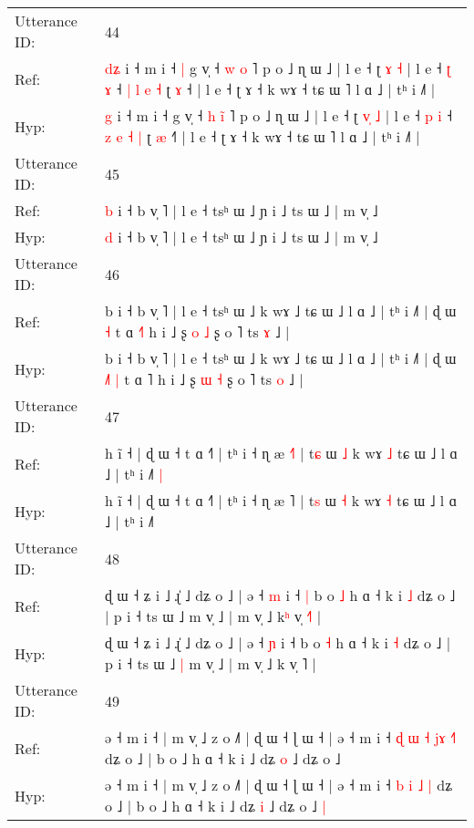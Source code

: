 \documentclass[10pt]{article}
\DeclareRobustCommand{\hl}[1]{{\textcolor{red}{#1}}}
\begin{document}
\begin{longtable}{ll}
\midrule
Utterance ID: & 44 \\
Ref: & \hl{d}\hl{ʑ} i ˧ m i ˧\hl{ }\hl{|} g v̩ ˧ \hl{w} \hl{}\hl{o} ˥ p o ˩ ɳ ɯ ˩ | l e ˧ ʈ \hl{}\hl{ɤ} \hl{˧} | l e ˧ \hl{ʈ} \hl{ɤ} ˧ \hl{|} \hl{l} \hl{e} \hl{˧} ʈ \hl{ɤ} ˧\hl{} | l e ˧ ʈ ɤ ˧ k wɤ ˧ tɕ ɯ ˥ l ɑ ˩ | tʰ i ˩˥ |
 \\
Hyp: & \hl{}\hl{g} i ˧ m i ˧\hl{}\hl{} g v̩ ˧ \hl{h} \hl{i}\hl{̃} ˥ p o ˩ ɳ ɯ ˩ | l e ˧ ʈ \hl{v}\hl{̩} \hl{˩} | l e ˧ \hl{p} \hl{i} ˧ \hl{z} \hl{e} \hl{˧} \hl{|} ʈ \hl{æ} ˧\hl{˥} | l e ˧ ʈ ɤ ˧ k wɤ ˧ tɕ ɯ ˥ l ɑ ˩ | tʰ i ˩˥ |
 \\
\midrule
Utterance ID: & 45 \\
Ref: & \hl{b} i ˧ b v̩ ˥ | l e ˧ tsʰ ɯ ˩ ɲ i ˩ ts ɯ ˩ | m v̩ ˩
 \\
Hyp: & \hl{d} i ˧ b v̩ ˥ | l e ˧ tsʰ ɯ ˩ ɲ i ˩ ts ɯ ˩ | m v̩ ˩
 \\
\midrule
Utterance ID: & 46 \\
Ref: & b i ˧ b v̩ ˥ | l e ˧ tsʰ ɯ ˩ k wɤ ˩ tɕ ɯ ˩ l ɑ ˩ | tʰ i ˩˥ | ɖ ɯ\hl{}\hl{}\hl{} \hl{˧} t ɑ \hl{˧}˥ h i ˩ ʂ \hl{o} \hl{˩} ʂ o ˥ ts \hl{ɤ} ˩ |
 \\
Hyp: & b i ˧ b v̩ ˥ | l e ˧ tsʰ ɯ ˩ k wɤ ˩ tɕ ɯ ˩ l ɑ ˩ | tʰ i ˩˥ | ɖ ɯ\hl{ }\hl{˩}\hl{˥} \hl{|} t ɑ \hl{}˥ h i ˩ ʂ \hl{ɯ} \hl{˧} ʂ o ˥ ts \hl{o} ˩ |
 \\
\midrule
Utterance ID: & 47 \\
Ref: & h ĩ ˧ | ɖ ɯ ˧ t ɑ ˧˥ | tʰ i ˧ ɳ æ \hl{˧}˥ | t\hl{ɕ} ɯ \hl{˩} k wɤ \hl{˩} tɕ ɯ ˩ l ɑ ˩ | tʰ i ˩˥\hl{ }\hl{|}
 \\
Hyp: & h ĩ ˧ | ɖ ɯ ˧ t ɑ ˧˥ | tʰ i ˧ ɳ æ \hl{}˥ | t\hl{s} ɯ \hl{˧} k wɤ \hl{˧} tɕ ɯ ˩ l ɑ ˩ | tʰ i ˩˥\hl{}\hl{}
 \\
\midrule
Utterance ID: & 48 \\
Ref: & ɖ ɯ ˧ ʑ i ˩ ɻ̍ ˩ dʑ o ˩ | ə ˧ \hl{m} i ˧\hl{ }\hl{|} b o \hl{˩} h ɑ ˧ k i \hl{˩} dʑ o ˩ | p i ˧ ts ɯ ˩\hl{}\hl{} m v̩ ˩ | m v̩ ˩ k\hl{ʰ} v̩ \hl{˧}˥ |
 \\
Hyp: & ɖ ɯ ˧ ʑ i ˩ ɻ̍ ˩ dʑ o ˩ | ə ˧ \hl{ɲ} i ˧\hl{}\hl{} b o \hl{˧} h ɑ ˧ k i \hl{˧} dʑ o ˩ | p i ˧ ts ɯ ˩\hl{ }\hl{|} m v̩ ˩ | m v̩ ˩ k\hl{} v̩ \hl{}˥ |
 \\
\midrule
Utterance ID: & 49 \\
Ref: & ə ˧ m i ˧ | m v̩ ˩ z o ˩˥ | ɖ ɯ ˧ ɭ ɯ ˧ | ə ˧ m i ˧\hl{ }\hl{ɖ} \hl{ɯ} \hl{˧} \hl{j}\hl{ɤ} \hl{˧}\hl{˥} dʑ o ˩ | b o ˩ h ɑ ˧ k i ˩ dʑ \hl{o} ˩ dʑ o ˩\hl{}\hl{}
 \\
Hyp: & ə ˧ m i ˧ | m v̩ ˩ z o ˩˥ | ɖ ɯ ˧ ɭ ɯ ˧ | ə ˧ m i ˧\hl{}\hl{} \hl{b} \hl{i} \hl{}\hl{˩} \hl{}\hl{|} dʑ o ˩ | b o ˩ h ɑ ˧ k i ˩ dʑ \hl{i} ˩ dʑ o ˩\hl{ }\hl{|}

\end{longtable}
\end{document}
